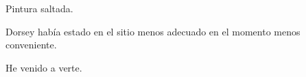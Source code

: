 \sk
Pintura saltada. 

\sk
Dorsey había estado en el sitio menos
adecuado en el momento menos conveniente.

\sk
He venido a verte.

\sk
\nb{}

\sk
\nb{}

\sk
\nb{}

\sk
\nb{}

\sk
\nb{}

\sk
\nb{}

\sk
\nb{}

\sk
\nb{}

\sk
\nb{}

\sk
\nb{}

\sk
\nb{}

\sk
\nb{}

\sk
\nb{}

\sk
\nb{}

\sk
\nb{}

\sk
\nb{}

\sk
\nb{}

\sk
\nb{}

\sk
\nb{}

\sk
\nb{}

\sk
\nb{}

\sk
\nb{}


